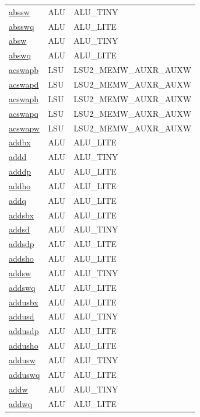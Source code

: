 \begin{small}
\begin{longtable}[l]{l l l}
\hyperlink{lvx.abssw}{abssw} & ALU & ALU\_TINY \\ 
\hyperlink{lvx.absswq}{absswq} & ALU & ALU\_LITE \\ 
\hyperlink{lvx.absw}{absw} & ALU & ALU\_TINY \\ 
\hyperlink{lvx.abswq}{abswq} & ALU & ALU\_LITE \\ 
\hyperlink{lvx.acswapb}{acswapb} & LSU & LSU2\_MEMW\_AUXR\_AUXW \\ 
\hyperlink{lvx.acswapd}{acswapd} & LSU & LSU2\_MEMW\_AUXR\_AUXW \\ 
\hyperlink{lvx.acswaph}{acswaph} & LSU & LSU2\_MEMW\_AUXR\_AUXW \\ 
\hyperlink{lvx.acswapq}{acswapq} & LSU & LSU2\_MEMW\_AUXR\_AUXW \\ 
\hyperlink{lvx.acswapw}{acswapw} & LSU & LSU2\_MEMW\_AUXR\_AUXW \\ 
\hyperlink{lvx.addbx}{addbx} & ALU & ALU\_LITE \\ 
\hyperlink{lvx.addd}{addd} & ALU & ALU\_TINY \\ 
\hyperlink{lvx.adddp}{adddp} & ALU & ALU\_LITE \\ 
\hyperlink{lvx.addho}{addho} & ALU & ALU\_LITE \\ 
\hyperlink{lvx.addq}{addq} & ALU & ALU\_LITE \\ 
\hyperlink{lvx.addsbx}{addsbx} & ALU & ALU\_LITE \\ 
\hyperlink{lvx.addsd}{addsd} & ALU & ALU\_TINY \\ 
\hyperlink{lvx.addsdp}{addsdp} & ALU & ALU\_LITE \\ 
\hyperlink{lvx.addsho}{addsho} & ALU & ALU\_LITE \\ 
\hyperlink{lvx.addsw}{addsw} & ALU & ALU\_TINY \\ 
\hyperlink{lvx.addswq}{addswq} & ALU & ALU\_LITE \\ 
\hyperlink{lvx.addusbx}{addusbx} & ALU & ALU\_LITE \\ 
\hyperlink{lvx.addusd}{addusd} & ALU & ALU\_TINY \\ 
\hyperlink{lvx.addusdp}{addusdp} & ALU & ALU\_LITE \\ 
\hyperlink{lvx.addusho}{addusho} & ALU & ALU\_LITE \\ 
\hyperlink{lvx.addusw}{addusw} & ALU & ALU\_TINY \\ 
\hyperlink{lvx.adduswq}{adduswq} & ALU & ALU\_LITE \\ 
\hyperlink{lvx.addw}{addw} & ALU & ALU\_TINY \\ 
\hyperlink{lvx.addwq}{addwq} & ALU & ALU\_LITE \\ 

\end{longtable}
\end{small}
